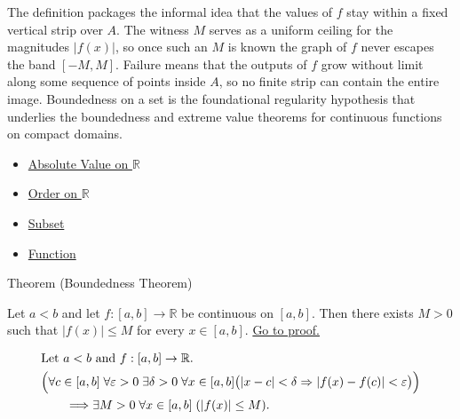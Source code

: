 \begin{remark*}[Interpretation]
The definition packages the informal idea that the values of $f$ stay within a fixed vertical strip over $A$. The witness $M$ serves as a uniform ceiling for the magnitudes $|f(x)|$, so once such an $M$ is known the graph of $f$ never escapes the band $[-M,M]$. Failure means that the outputs of $f$ grow without limit along some sequence of points inside $A$, so no finite strip can contain the entire image. Boundedness on a set is the foundational regularity hypothesis that underlies the boundedness and extreme value theorems for continuous functions on compact domains.
\end{remark*}

\begin{dependencies}
\begin{itemize}
  \item \hyperref[def:real-chapter-absolute-value-on-r]{Absolute Value on $\mathbb{R}$}
  \item \hyperref[def:order-on-r]{Order on $\mathbb{R}$}
  \item \hyperref[def:subset]{Subset}
  \item \hyperref[def:function]{Function}
\end{itemize}
\end{dependencies}

\begin{theorembox}{Theorem (Boundedness Theorem)}
\begin{theorem}
\label{thm:boundedness-theorem}
Let $a<b$ and let $f:[a,b]\to\mathbb{R}$ be continuous on $[a,b]$. Then there exists $M>0$ such that $|f(x)|\le M$ for every $x\in[a,b]$.
\hyperref[prf:boundedness-theorem]{Go to proof.}
\end{theorem}
\end{theorembox}

\begin{remark*}
\[
\begin{aligned}
&\text{Let } a<b \text{ and } f:[a,b]\to\mathbb{R}.\\
&\Bigl(\forall c\in[a,b]\;\forall \varepsilon>0\;\exists \delta>0\;\forall x\in[a,b]\bigl(|x-c|<\delta \Rightarrow |f(x)-f(c)|<\varepsilon\bigr)\Bigr)\\
&\qquad\Longrightarrow \exists M>0\;\forall x\in[a,b]\;(|f(x)|\le M).
\end{aligned}
\]
\end{remark*}

